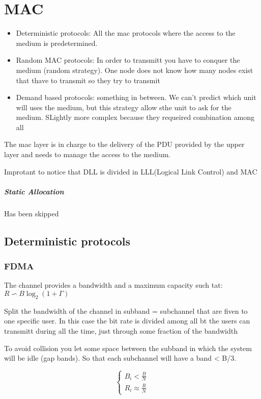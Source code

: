 \chapter{MAC}
\begin{itemize}
\item Deterministic protocols: All the mac protocols where the access to the medium is predetermined. 
\item Random MAC protocols: In order to transmitt you have to conquer the medium (random strategy). One node does not know how many nodes exist that thave to transmit so they try to transmit 
\item Demand based protocols: something in between. We can't predict which unit will uses the medium, but this strategy allow sthe unit to ask for the medium. SLightly more complex because they requeired combination among all
\end{itemize}

The mac layer is in charge to the delivery of the PDU provided by the upper layer and needs to manage the access to the medium. 

Improtant to notice that DLL is divided in LLL(Logical Link Control) and MAC 

\paragraph{Static Allocation}
Has been skipped
\section{Deterministic protocols}
\subsection{FDMA}
The channel provides a bandwidth and a maximum capacity such tat: $R \backsim B\log_2 (1+\Gamma)$

Split the bandwidth of the channel in subband = subchannel that are fiven to one specific user.  In this case the bit rate is divided among all bt the users can transmitt during all the time, just through some fraction of the bandwidth

To avoid collision you let some space between the subband in which the system will be idle (gap bands). So that each subchannel will have a band < B/3. 

\begin{equation}
\begin{cases}
B_i < \frac{B}{N}\\
R_i \approx \frac{R}{N}
\end{cases}
\end{equation}

